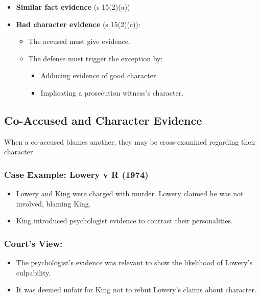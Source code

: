 \begin{itemize}
\tightlist
\item
  \textbf{Similar fact evidence} (s 15(2)(a))
\item
  \textbf{Bad character evidence} (s 15(2)(c)):

  \begin{itemize}
  \tightlist
  \item
    The accused must give evidence.
  \item
    The defense must trigger the exception by:

    \begin{itemize}
    \tightlist
    \item
      Adducing evidence of good character.
    \item
      Implicating a prosecution witness's character.
    \end{itemize}
  \end{itemize}
\end{itemize}

\subsection{Co-Accused and Character
Evidence}\label{co-accused-and-character-evidence}

When a co-accused blames another, they may be cross-examined regarding
their character.

\subsubsection{\texorpdfstring{Case Example: \textbf{Lowery v R
(1974)}}{Case Example: Lowery v R (1974)}}\label{case-example-lowery-v-r-1974}

\begin{itemize}
\tightlist
\item
  Lowery and King were charged with murder. Lowery claimed he was not
  involved, blaming King.
\item
  King introduced psychologist evidence to contrast their personalities.
\end{itemize}

\subsubsection{Court's View:}\label{courts-view}

\begin{itemize}
\tightlist
\item
  The psychologist's evidence was relevant to show the likelihood of
  Lowery's culpability.
\item
  It was deemed unfair for King not to rebut Lowery's claims about
  character.
\end{itemize}

